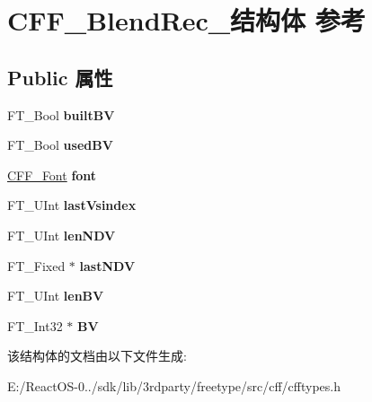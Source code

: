 \hypertarget{struct_c_f_f___blend_rec__}{}\section{C\+F\+F\+\_\+\+Blend\+Rec\+\_\+结构体 参考}
\label{struct_c_f_f___blend_rec__}
\subsection*{Public 属性}
\begin{DoxyCompactItemize}
\item 
\mbox{\label{struct_c_f_f___blend_rec___a1d2a3e96e3a8eab975ab087ae9527d0f}} 
F\+T\+\_\+\+Bool {\bfseries built\+BV}
\item 
\mbox{\label{struct_c_f_f___blend_rec___a8ccee4648bfd589457d60764bd25c5b3}} 
F\+T\+\_\+\+Bool {\bfseries used\+BV}
\item 
\mbox{\label{struct_c_f_f___blend_rec___a2387f86f6a3e1b0c2d3c287f9f09c9aa}} 
\hyperlink{struct_c_f_f___font_rec__}{C\+F\+F\+\_\+\+Font} {\bfseries font}
\item 
\mbox{\label{struct_c_f_f___blend_rec___a14afed7431921bc3eb4d1f7fdb90453b}} 
F\+T\+\_\+\+U\+Int {\bfseries last\+Vsindex}
\item 
\mbox{\label{struct_c_f_f___blend_rec___a1823840a00a84dd4b9315f7a1cedc17f}} 
F\+T\+\_\+\+U\+Int {\bfseries len\+N\+DV}
\item 
\mbox{\label{struct_c_f_f___blend_rec___ac180faa82da4cb32bec6386d6001a6fc}} 
F\+T\+\_\+\+Fixed $\ast$ {\bfseries last\+N\+DV}
\item 
\mbox{\label{struct_c_f_f___blend_rec___ab6dd60964fc3bf9cb434c61e1d458935}} 
F\+T\+\_\+\+U\+Int {\bfseries len\+BV}
\item 
\mbox{\label{struct_c_f_f___blend_rec___ac94099cba36f8a6c5718d9074126ee57}} 
F\+T\+\_\+\+Int32 $\ast$ {\bfseries BV}
\end{DoxyCompactItemize}


该结构体的文档由以下文件生成\+:\begin{DoxyCompactItemize}
\item 
E\+:/\+React\+O\+S-\/0../sdk/lib/3rdparty/freetype/src/cff/cfftypes.\+h\end{DoxyCompactItemize}
